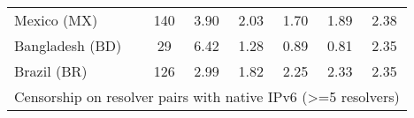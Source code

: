 \begin{table}[h!]
{\begin{tabular}{lcccccc}
Mexico (MX) & \color{black} 140 & {\cellcolor[HTML]{6AAED6}} \color[HTML]{F1F1F1} \color{black} 3.90 & {\cellcolor[HTML]{E8F1FA}} \color[HTML]{000000} \color{black} 2.03 & {\cellcolor[HTML]{F7FBFF}} \color[HTML]{000000} \color{black} 1.70 & {\cellcolor[HTML]{EEF5FC}} \color[HTML]{000000} \color{black} 1.89 & \color{black} 2.38 \\
Bangladesh (BD) & \color{black} 29 & {\cellcolor[HTML]{6AAED6}} \color[HTML]{F1F1F1} \color{black} 6.42 & {\cellcolor[HTML]{EFF6FC}} \color[HTML]{000000} \color{black} 1.28 & {\cellcolor[HTML]{F6FAFF}} \color[HTML]{000000} \color{black} 0.89 & {\cellcolor[HTML]{F7FBFF}} \color[HTML]{000000} \color{black} 0.81 & \color{black} 2.35 \\
Brazil (BR) & \color{black} 126 & {\cellcolor[HTML]{6AAED6}} \color[HTML]{F1F1F1} \color{black} 2.99 & {\cellcolor[HTML]{F7FBFF}} \color[HTML]{000000} \color{black} 1.82 & {\cellcolor[HTML]{D3E3F3}} \color[HTML]{000000} \color{black} 2.25 & {\cellcolor[HTML]{CDDFF1}} \color[HTML]{000000} \color{black} 2.33 & \color{black} 2.35 \\

    \midrule
    \multicolumn{7}{c}{Censorship on resolver pairs with native IPv6 (>=5
    resolvers)}\\
    \midrule


\end{tabular}}
\end{table}
